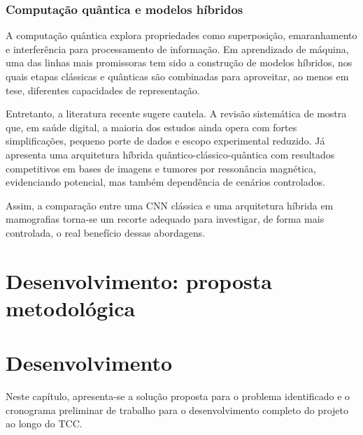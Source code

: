 \documentclass[
    12pt,
    openright,
    oneside,
    a4paper,
    english,
    brazil
]{abntex2}
\begin{document}
\subsection{Computação quântica e modelos híbridos}

A computação quântica explora propriedades como superposição, emaranhamento e interferência para processamento de informação. Em aprendizado de máquina, uma das linhas mais promissoras tem sido a construção de modelos híbridos, nos quais etapas clássicas e quânticas são combinadas para aproveitar, ao menos em tese, diferentes capacidades de representação.

Entretanto, a literatura recente sugere cautela. A revisão sistemática de  mostra que, em saúde digital, a maioria dos estudos ainda opera com fortes simplificações, pequeno porte de dados e escopo experimental reduzido. Já  apresenta uma arquitetura híbrida quântico-clássico-quântica com resultados competitivos em bases de imagens e tumores por ressonância magnética, evidenciando potencial, mas também dependência de cenários controlados.

Assim, a comparação entre uma CNN clássica e uma arquitetura híbrida em mamografias torna-se um recorte adequado para investigar, de forma mais controlada, o real benefício dessas abordagens.




\chapter{Desenvolvimento: proposta metodológica}

\chapter{Desenvolvimento}
\label{cap:desenvolvimento}

Neste capítulo, apresenta-se a solução proposta para o problema identificado e o cronograma preliminar de trabalho para o desenvolvimento completo do projeto ao longo do TCC.
\end{document}
